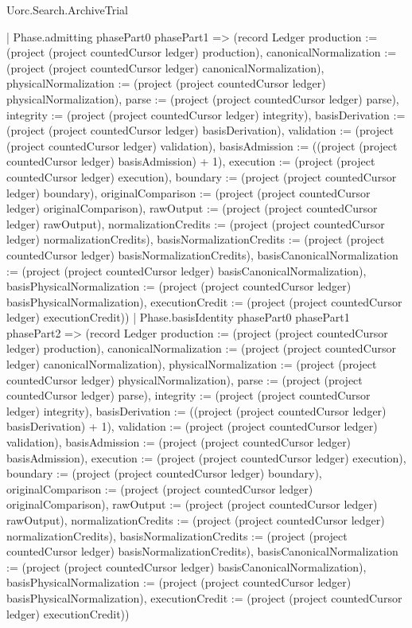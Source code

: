 \begin{lexlean}{Uorc.Search.ArchiveTrial}
\begin{semanticmodule}
{{    | Phase.admitting phasePart0 phasePart1 => (record Ledger {production := (project (project countedCursor ledger) production), canonicalNormalization := (project (project countedCursor ledger) canonicalNormalization), physicalNormalization := (project (project countedCursor ledger) physicalNormalization), parse := (project (project countedCursor ledger) parse), integrity := (project (project countedCursor ledger) integrity), basisDerivation := (project (project countedCursor ledger) basisDerivation), validation := (project (project countedCursor ledger) validation), basisAdmission := ((project (project countedCursor ledger) basisAdmission) + 1), execution := (project (project countedCursor ledger) execution), boundary := (project (project countedCursor ledger) boundary), originalComparison := (project (project countedCursor ledger) originalComparison), rawOutput := (project (project countedCursor ledger) rawOutput), normalizationCredits := (project (project countedCursor ledger) normalizationCredits), basisNormalizationCredits := (project (project countedCursor ledger) basisNormalizationCredits), basisCanonicalNormalization := (project (project countedCursor ledger) basisCanonicalNormalization), basisPhysicalNormalization := (project (project countedCursor ledger) basisPhysicalNormalization), executionCredit := (project (project countedCursor ledger) executionCredit)})
    | Phase.basisIdentity phasePart0 phasePart1 phasePart2 => (record Ledger {production := (project (project countedCursor ledger) production), canonicalNormalization := (project (project countedCursor ledger) canonicalNormalization), physicalNormalization := (project (project countedCursor ledger) physicalNormalization), parse := (project (project countedCursor ledger) parse), integrity := (project (project countedCursor ledger) integrity), basisDerivation := ((project (project countedCursor ledger) basisDerivation) + 1), validation := (project (project countedCursor ledger) validation), basisAdmission := (project (project countedCursor ledger) basisAdmission), execution := (project (project countedCursor ledger) execution), boundary := (project (project countedCursor ledger) boundary), originalComparison := (project (project countedCursor ledger) originalComparison), rawOutput := (project (project countedCursor ledger) rawOutput), normalizationCredits := (project (project countedCursor ledger) normalizationCredits), basisNormalizationCredits := (project (project countedCursor ledger) basisNormalizationCredits), basisCanonicalNormalization := (project (project countedCursor ledger) basisCanonicalNormalization), basisPhysicalNormalization := (project (project countedCursor ledger) basisPhysicalNormalization), executionCredit := (project (project countedCursor ledger) executionCredit)})
}}
\end{semanticmodule}
\end{lexlean}
